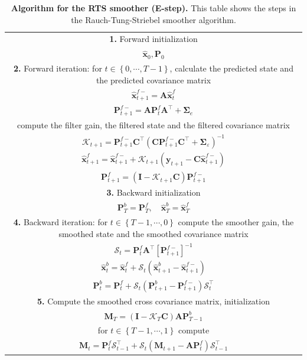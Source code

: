 \documentclass[review,authoryear,3p]{elsarticle}
\begin{document}
\begin{table}[!ht]
\begin{tabular}{|c|}\hline
\multicolumn{1}{|p{16cm}|}{\textbf{1.} Forward initialization} \\ 
$\hat{\mathbf x}_0, \mathbf P_0$ \\
\hline
\multicolumn{1}{|p{16cm}|}{\textbf{2.} Forward iteration: for $t\in\left\lbrace 0,\cdots,T-1\right\rbrace $, calculate the predicted state and the predicted covariance matrix } \\
$\hat{\mathbf x}_{t+1}^{f-}=\mathbf A \hat{\mathbf x}_{t}^{f}$  \\ 
$\mathbf P_{t+1}^{f-}=\mathbf A \mathbf P_{t}^{f}\mathbf A^{\top}+\boldsymbol\Sigma_e$  \\
\multicolumn{1}{|p{16cm}|}{compute the filter gain, the filtered state and the filtered covariance matrix} \\
$\mathcal K_{t+1}=\mathbf P_{t +1}^{f-}\mathbf C ^\top(\mathbf C \mathbf P_{t +1}^{f-}\mathbf C ^\top+\boldsymbol \Sigma_{\varepsilon})^{-1}$\\
$\hat{\mathbf x}_{t+1}^{f}=\hat{\mathbf x}_{t+1}^{f-}+\mathcal K_{t+1}(\mathbf y_{t+1}-\mathbf C\hat{\mathbf x}_{t +1}^{f-})$\\
$\mathbf P_{t+1}^f=(\mathbf I - \mathcal K_{t+1}\mathbf C)\mathbf P_{t +1}^{f-}$\\
\hline
\multicolumn{1}{|p{16cm}|}{\textbf{3.} Backward initialization}\\
 $\mathbf P_T^b= \mathbf P_T^f, \quad \hat{\mathbf x}^b_T= \hat{\mathbf x}^f_T$\\
\hline
\multicolumn{1}{|p{16cm}|}{\textbf{4.} Backward iteration: for $t\in\left\lbrace T-1,\cdots,0\right\rbrace $ compute the smoother gain, the smoothed state and the smoothed covariance matrix}\\  
$\mathcal S_{t}=\mathbf P_{t}^{f}\mathbf A^{\top}\left[ \mathbf P_{t +1}^{f-}\right]^{-1}$ \\
 $\hat{\mathbf x}_t^b=\hat{\mathbf x}_t^f+\mathcal S_t(\hat{\mathbf x}_{t+1}^{b}-\hat{\mathbf x}_{t+1}^{f-})$ \\
 $\mathbf P_{t}^{b}=\mathbf P_{t}^{f}+\mathcal S_t(\mathbf P_{t+1}^{b}-\mathbf P_{t+1}^{f-})\mathcal S_t^\top$\\  
\hline
\multicolumn{1}{|p{16cm}|}{\textbf{5.} Compute the smoothed cross covariance matrix, initialization}\\
$\mathbf M_T=(\mathbf I-\mathcal K_T\mathbf C)\mathbf A\mathbf P_{T-1}^b$\\
\multicolumn{1}{|p{16cm}|}{for $t\in\left\lbrace T-1,\cdots,1\right\rbrace $ compute}\\
$\mathbf M_t= \mathbf P_t^{f}\mathcal S_{t-1}^{\top}+\mathcal S_{t}(\mathbf M_{t+1}-\mathbf A\mathbf P_t^{f} )\mathcal S_{t-1}^{\top}$\\
\hline
\end{tabular}
\caption{\textbf{Algorithm for the RTS smoother (E-step).} This table shows the steps in the  Rauch-Tung-Striebel smoother algorithm.}
\label{alg:MRA-RTS}
\end{table}
\end{document}
